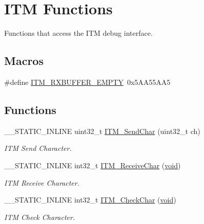 \hypertarget{group__CMSIS__core__DebugFunctions}{\section{I\-T\-M Functions}
\label{group__CMSIS__core__DebugFunctions}
}


Functions that access the I\-T\-M debug interface.  


\subsection*{Macros}
\begin{DoxyCompactItemize}
\item 
\#define \hyperlink{group__CMSIS__core__DebugFunctions_gaa822cb398ee022b59e9e6c5d7bbb228a}{I\-T\-M\-\_\-\-R\-X\-B\-U\-F\-F\-E\-R\-\_\-\-E\-M\-P\-T\-Y}~0x5\-A\-A55\-A\-A5
\end{DoxyCompactItemize}
\subsection*{Functions}
\begin{DoxyCompactItemize}
\item 
\-\_\-\-\_\-\-S\-T\-A\-T\-I\-C\-\_\-\-I\-N\-L\-I\-N\-E uint32\-\_\-t \hyperlink{group__CMSIS__core__DebugFunctions_gac90a497bd64286b84552c2c553d3419e}{I\-T\-M\-\_\-\-Send\-Char} (uint32\-\_\-t ch)
\begin{DoxyCompactList}\small\item\em I\-T\-M Send Character. \end{DoxyCompactList}\item 
\-\_\-\-\_\-\-S\-T\-A\-T\-I\-C\-\_\-\-I\-N\-L\-I\-N\-E int32\-\_\-t \hyperlink{group__CMSIS__core__DebugFunctions_gac3ee2c30a1ac4ed34c8a866a17decd53}{I\-T\-M\-\_\-\-Receive\-Char} (\hyperlink{Paradigm_2Tern__EE_2small_2portmacro_8h_a14d32f8130d3c0b212cfc751730b5b49}{void})
\begin{DoxyCompactList}\small\item\em I\-T\-M Receive Character. \end{DoxyCompactList}\item 
\-\_\-\-\_\-\-S\-T\-A\-T\-I\-C\-\_\-\-I\-N\-L\-I\-N\-E int32\-\_\-t \hyperlink{group__CMSIS__core__DebugFunctions_gae61ce9ca5917735325cd93b0fb21dd29}{I\-T\-M\-\_\-\-Check\-Char} (\hyperlink{Paradigm_2Tern__EE_2small_2portmacro_8h_a14d32f8130d3c0b212cfc751730b5b49}{void})
\begin{DoxyCompactList}\small\item\em I\-T\-M Check Character. \end{DoxyCompactList}\end{DoxyCompactItemize}
